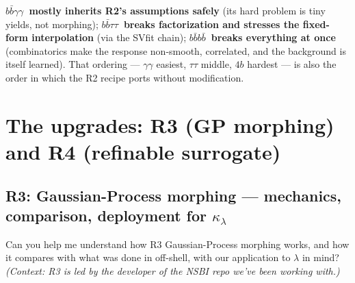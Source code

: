 \documentclass[11pt]{article}
\newcommand{\kl}{\ensuremath{\kappa_\lambda}}
\newcommand{\bbtt}{\ensuremath{b\bar b\tau\tau}}
\newcommand{\bbgg}{\ensuremath{b\bar b\gamma\gamma}}
\newcommand{\fourb}{\ensuremath{b\bar bb\bar b}}
\begin{document}
\begin{takeaway}
\textbf{\bbgg\ mostly inherits R2's assumptions safely} (its hard problem is tiny yields, not morphing);
\textbf{\bbtt\ breaks factorization and stresses the fixed-form interpolation} (via the SVfit chain);
\textbf{\fourb\ breaks everything at once} (combinatorics make the response non-smooth, correlated, and the
background is itself learned). That ordering --- $\gamma\gamma$ easiest, $\tau\tau$ middle, $4b$ hardest --- is
also the order in which the R2 recipe ports without modification.
\end{takeaway}

\section{The upgrades: R3 (GP morphing) and R4 (refinable surrogate)}\label{sec:upgrades}

\subsection{R3: Gaussian-Process morphing --- mechanics, comparison, deployment for \kl}\label{sec:gp}

\begin{qbox}[Question]
Can you help me understand how R3 Gaussian-Process morphing works, and how it compares with what was done in
off-shell, with our application to $\lambda$ in mind? \emph{(Context: R3 is led by the developer of the NSBI
repo we've been working with.)}
\end{qbox}
\end{document}
